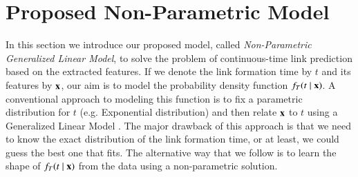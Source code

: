 
\section{Proposed Non-Parametric Model}\label{sec:method}
In this section we introduce our proposed model, called \emph{Non-Parametric Generalized Linear Model}, to solve the problem of continuous-time link prediction based on the extracted features. 
If we denote the link formation time by $t$ and its features by $\mathbf{x}$, our aim is to model the probability density function $f_T(t\mid \mathbf{x})$. A conventional approach to modeling this function is to fix a parametric distribution for $t$ (e.g. Exponential distribution) and then relate $\mathbf{x}$ to $t$ using a Generalized Linear Model \cite{sun2012will}. The major drawback of this approach is that we need to know the exact distribution of the link formation time, or at least, we could guess the best one that fits. The alternative way that we follow is to learn the shape of $f_T(t\mid \mathbf{x})$ from the data using a non-parametric solution.

